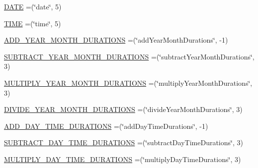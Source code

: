 \begin{DoxyCompactItemize}
\item 
\hyperlink{enumorg_1_1semanticweb_1_1owlapi_1_1vocab_1_1_s_w_r_l_built_ins_vocabulary_a4b1723ae21aa80318f56ad07c4d8fc03}{D\-A\-T\-E} =(\char`\"{}date\char`\"{}, 5)
\item 
\hyperlink{enumorg_1_1semanticweb_1_1owlapi_1_1vocab_1_1_s_w_r_l_built_ins_vocabulary_aaf9f01d878684e85572ef98c7d35e292}{T\-I\-M\-E} =(\char`\"{}time\char`\"{}, 5)
\item 
\hyperlink{enumorg_1_1semanticweb_1_1owlapi_1_1vocab_1_1_s_w_r_l_built_ins_vocabulary_a55183edd4fb5807ce4ac20017a01f478}{A\-D\-D\-\_\-\-Y\-E\-A\-R\-\_\-\-M\-O\-N\-T\-H\-\_\-\-D\-U\-R\-A\-T\-I\-O\-N\-S} =(\char`\"{}add\-Year\-Month\-Durations\char`\"{}, -\/1)
\item 
\hyperlink{enumorg_1_1semanticweb_1_1owlapi_1_1vocab_1_1_s_w_r_l_built_ins_vocabulary_a233bcc47a8671f53779ae62b161b2727}{S\-U\-B\-T\-R\-A\-C\-T\-\_\-\-Y\-E\-A\-R\-\_\-\-M\-O\-N\-T\-H\-\_\-\-D\-U\-R\-A\-T\-I\-O\-N\-S} =(\char`\"{}subtract\-Year\-Month\-Durations\char`\"{}, 3)
\item 
\hyperlink{enumorg_1_1semanticweb_1_1owlapi_1_1vocab_1_1_s_w_r_l_built_ins_vocabulary_a510d657114b9ada2b25afcc32a0f550e}{M\-U\-L\-T\-I\-P\-L\-Y\-\_\-\-Y\-E\-A\-R\-\_\-\-M\-O\-N\-T\-H\-\_\-\-D\-U\-R\-A\-T\-I\-O\-N\-S} =(\char`\"{}multiply\-Year\-Month\-Durations\char`\"{}, 3)
\item 
\hyperlink{enumorg_1_1semanticweb_1_1owlapi_1_1vocab_1_1_s_w_r_l_built_ins_vocabulary_a4b71de62cc6c7dec01b880b31a8ae206}{D\-I\-V\-I\-D\-E\-\_\-\-Y\-E\-A\-R\-\_\-\-M\-O\-N\-T\-H\-\_\-\-D\-U\-R\-A\-T\-I\-O\-N\-S} =(\char`\"{}divide\-Year\-Month\-Durations\char`\"{}, 3)
\item 
\hyperlink{enumorg_1_1semanticweb_1_1owlapi_1_1vocab_1_1_s_w_r_l_built_ins_vocabulary_a0d1121187cd982ad4bf52ff65ce43b7d}{A\-D\-D\-\_\-\-D\-A\-Y\-\_\-\-T\-I\-M\-E\-\_\-\-D\-U\-R\-A\-T\-I\-O\-N\-S} =(\char`\"{}add\-Day\-Time\-Durations\char`\"{}, -\/1)
\item 
\hyperlink{enumorg_1_1semanticweb_1_1owlapi_1_1vocab_1_1_s_w_r_l_built_ins_vocabulary_a4c75016bef57d413f3ee854151ae781b}{S\-U\-B\-T\-R\-A\-C\-T\-\_\-\-D\-A\-Y\-\_\-\-T\-I\-M\-E\-\_\-\-D\-U\-R\-A\-T\-I\-O\-N\-S} =(\char`\"{}subtract\-Day\-Time\-Durations\char`\"{}, 3)
\item 
\hyperlink{enumorg_1_1semanticweb_1_1owlapi_1_1vocab_1_1_s_w_r_l_built_ins_vocabulary_a601c5132ca821f83f6d649fbf6d503a5}{M\-U\-L\-T\-I\-P\-L\-Y\-\_\-\-D\-A\-Y\-\_\-\-T\-I\-M\-E\-\_\-\-D\-U\-R\-A\-T\-I\-O\-N\-S} =(\char`\"{}multiply\-Day\-Time\-Durations\char`\"{}, 3)

\end{DoxyCompactItemize}
